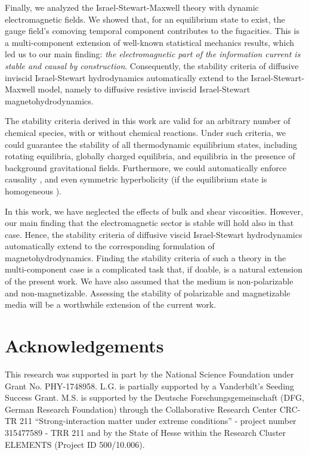 \documentclass[
a4paper,
amsfonts,
amsmath,
reprint,
showkeys,
nofootinbib,
twoside,
onecolumn,
notitlepage
]{revtex4-1}
\begin{document}
	Finally, we analyzed the Israel-Stewart-Maxwell theory with dynamic electromagnetic fields. 
	We showed that, for an equilibrium state to exist, the gauge field's comoving temporal component contributes to the fugacities. 
	This is a multi-component extension of well-known statistical mechanics results, which led us to our main finding: \textit{the electromagnetic part of the information current is stable and causal by construction}. 
	Consequently, the stability criteria of diffusive inviscid Israel-Stewart hydrodynamics automatically extend to the Israel-Stewart-Maxwell model, namely to diffusive resistive inviscid Israel-Stewart magnetohydrodynamics.
	
	The stability criteria derived in this work are valid for an arbitrary number of chemical species, with or without chemical reactions. 
    Under such criteria, we could guarantee the stability of all thermodynamic equilibrium states, including rotating equilibria, globally charged equilibria, and equilibria in the presence of background gravitational fields. 
    Furthermore, we could automatically enforce causality \cite{GavassinoCausality2021,GavassinoSuperluminal2021,GavassinoBounds2023}, and even symmetric hyperbolicity (if the equilibrium state is homogeneous \cite{GavassinoUniversality2023}).
	
	In this work, we have neglected the effects of bulk and shear viscosities. 
	However, our main finding that the electromagnetic sector is stable will hold also in that case. 
    Hence, the stability criteria of diffusive viscid Israel-Stewart hydrodynamics automatically extend to the corresponding formulation of magnetohydrodynamics. 
	Finding the stability criteria of such a theory in the multi-component case is a complicated task that, if doable, is a natural extension of the present work. 
	We have also assumed that the medium is non-polarizable and non-magnetizable. 
	Assessing the stability of polarizable and magnetizable media will be a worthwhile extension of the current work.
	
	
	\section*{Acknowledgements}
	
	This research was supported in part by the National Science Foundation under Grant No. PHY-1748958.
	L.G. is partially supported by a Vanderbilt's Seeding Success Grant. 
	M.S. is supported by the Deutsche Forschungsgemeinschaft
	(DFG, German Research Foundation) through the Collaborative Research
	Center CRC-TR 211 ``Strong-interaction matter under extreme conditions''
	- project number 315477589 - TRR 211 and by the State of Hesse within the Research Cluster
	ELEMENTS (Project ID 500/10.006).
	
\end{document}
